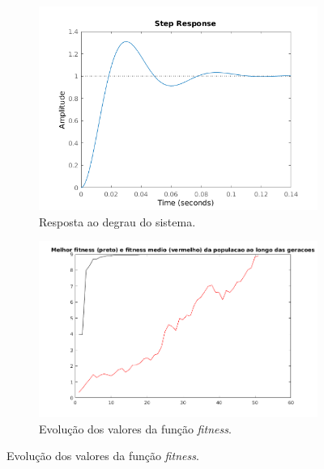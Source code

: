 \begin {enumerate}
    \FloatBarrier
			    
	\begin{figure}[h!]
	
	\centering
	
		\begin{subfigure}{.5\textwidth}
		  \centering
		  \includegraphics[width=1\linewidth]{pid/step_pid_ex_d_5}
		  \caption{Resposta ao degrau do sistema.}
		  \label{fig:pid_step_d_5}
		\end{subfigure}%
		\begin{subfigure}{.5\textwidth}
		  \centering
		  \includegraphics[width=1\linewidth]{pid/mutacao_pid_ex_d_5}
		  \caption{Evolução dos valores da função \textit{fitness}.}
		  \label{fig:pid_fitness_d_5}
		\end{subfigure}%
		

\end{figure}
\end{enumerate}
